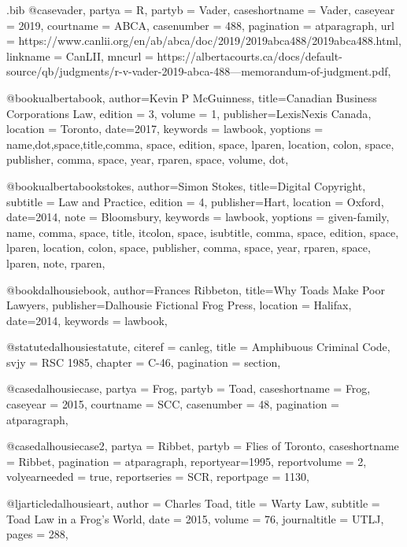 \begin{filecontents*}[overwrite]{\jobname.bib}
@case{vader,	partya =  {R},	partyb =  {Vader},	caseshortname =  {Vader},	caseyear =  {2019},	courtname =  {ABCA},	casenumber =  {488},	pagination =  {atparagraph}, url =  {https://www.canlii.org/en/ab/abca/doc/2019/2019abca488/2019abca488.html},	linkname =  {CanLII},	mncurl =  {https://albertacourts.ca/docs/default-source/qb/judgments/r-v-vader-2019-abca-488---memorandum-of-judgment.pdf},	}


@book{ualbertabook,
author={Kevin P McGuinness},
title={Canadian Business Corporations Law},
edition = {3},
volume = {1},
publisher={LexisNexis Canada},
location = {Toronto},
date={2017},
keywords = {lawbook},
yoptions = {name,dot,space,title,comma,
space,
edition,
space,
lparen, 
location,
colon,
space,
publisher,
comma,
space,
year,
rparen,
space,
volume,
dot},
}



@book{ualbertabookstokes,
author={Simon Stokes},
title={Digital Copyright},
subtitle = {Law and Practice},
edition = {4},
publisher={Hart},
location = {Oxford},
date={2014},
note = {Bloomsbury},
keywords = {lawbook},
yoptions = {given-family,
name,
comma,
space,
title,
itcolon,
space,
isubtitle,
comma,
space,
edition,
space,
lparen, 
location,
colon,
space,
publisher,
comma,
space,
year,
rparen,
space,
lparen,
note,
rparen},
}




@book{dalhousiebook,
author={Frances Ribbeton},
title={Why Toads Make Poor Lawyers},
publisher={Dalhousie Fictional Frog Press},
location = {Halifax},
date={2014},
keywords = {lawbook},
}

@statute{dalhousiestatute,
citeref = {canleg},
title = {Amphibuous Criminal Code},
svjy = {RSC 1985},
chapter = {C-46},
pagination = {section},
}

@case{dalhousiecase,
  partya = {Frog}, 
  partyb = {Toad},
  caseshortname = {Frog},
  caseyear = {2015},
  courtname = {SCC},
  casenumber = {48},
  pagination = {atparagraph},
	}

@case{dalhousiecase2,
  partya = {Ribbet}, 
  partyb = {Flies of Toronto},
  caseshortname = {Ribbet},
  pagination = {atparagraph},
  reportyear={1995},
  reportvolume = {2},
  volyearneeded = {true},
  reportseries = {SCR},
  reportpage = {1130},
	}


@ljarticle{dalhousieart,
author = {Charles Toad},
title = {Warty Law},
subtitle = {Toad Law in a Frog's World},
date = {2015},
volume = {76},
journaltitle = {UTLJ},
pages = {288},
}




\end{filecontents*}
